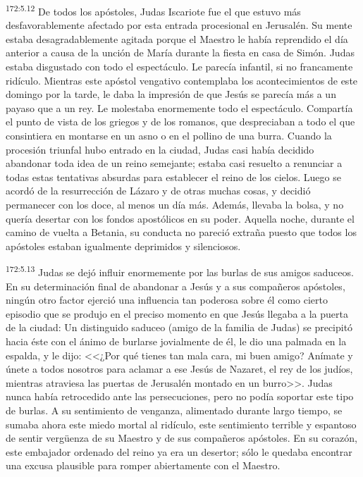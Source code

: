 \par 
\textsuperscript{172:5.12} De todos los apóstoles, Judas Iscariote fue el que estuvo más desfavorablemente afectado por esta entrada procesional en Jerusalén. Su mente estaba desagradablemente agitada porque el Maestro le había reprendido el día anterior a causa de la unción de María durante la fiesta en casa de Simón. Judas estaba disgustado con todo el espectáculo. Le parecía infantil, si no francamente ridículo. Mientras este apóstol vengativo contemplaba los acontecimientos de este domingo por la tarde, le daba la impresión de que Jesús se parecía más a un payaso que a un rey. Le molestaba enormemente todo el espectáculo. Compartía el punto de vista de los griegos y de los romanos, que despreciaban a todo el que consintiera en montarse en un asno o en el pollino de una burra. Cuando la procesión triunfal hubo entrado en la ciudad, Judas casi había decidido abandonar toda idea de un reino semejante; estaba casi resuelto a renunciar a todas estas tentativas absurdas para establecer el reino de los cielos. Luego se acordó de la resurrección de Lázaro y de otras muchas cosas, y decidió permanecer con los doce, al menos un día más. Además, llevaba la bolsa, y no quería desertar con los fondos apostólicos en su poder. Aquella noche, durante el camino de vuelta a Betania, su conducta no pareció extraña puesto que todos los apóstoles estaban igualmente deprimidos y silenciosos.

\par 
\textsuperscript{172:5.13} Judas se dejó influir enormemente por las burlas de sus amigos saduceos. En su determinación final de abandonar a Jesús y a sus compañeros apóstoles, ningún otro factor ejerció una influencia tan poderosa sobre él como cierto episodio que se produjo en el preciso momento en que Jesús llegaba a la puerta de la ciudad: Un distinguido saduceo (amigo de la familia de Judas) se precipitó hacia éste con el ánimo de burlarse jovialmente de él, le dio una palmada en la espalda, y le dijo: <<¿Por qué tienes tan mala cara, mi buen amigo? Anímate y únete a todos nosotros para aclamar a ese Jesús de Nazaret, el rey de los judíos, mientras atraviesa las puertas de Jerusalén montado en un burro>>. Judas nunca había retrocedido ante las persecuciones, pero no podía soportar este tipo de burlas. A su sentimiento de venganza, alimentado durante largo tiempo, se sumaba ahora este miedo mortal al ridículo, este sentimiento terrible y espantoso de sentir verg\"uenza de su Maestro y de sus compañeros apóstoles. En su corazón, este embajador ordenado del reino ya era un desertor; sólo le quedaba encontrar una excusa plausible para romper abiertamente con el Maestro.